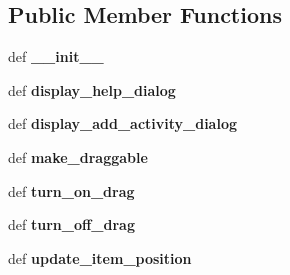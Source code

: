 \subsection*{Public Member Functions}
\begin{DoxyCompactItemize}
\item 
\hypertarget{classrunELFIN__Proto_1_1MyMainWindow_ae712f1531c068f6a48c7995d24eedb8b}{def {\bfseries \-\_\-\-\_\-init\-\_\-\-\_\-}}\label{classrunELFIN__Proto_1_1MyMainWindow_ae712f1531c068f6a48c7995d24eedb8b}

\item 
\hypertarget{classrunELFIN__Proto_1_1MyMainWindow_a9b4d571c6951792edf26a520921001bb}{def {\bfseries display\-\_\-help\-\_\-dialog}}\label{classrunELFIN__Proto_1_1MyMainWindow_a9b4d571c6951792edf26a520921001bb}

\item 
\hypertarget{classrunELFIN__Proto_1_1MyMainWindow_a47b0dcac1776188a9e28056635fd7588}{def {\bfseries display\-\_\-add\-\_\-activity\-\_\-dialog}}\label{classrunELFIN__Proto_1_1MyMainWindow_a47b0dcac1776188a9e28056635fd7588}

\item 
\hypertarget{classrunELFIN__Proto_1_1MyMainWindow_aba72f11babfa66d80c11a046c09332d1}{def {\bfseries make\-\_\-draggable}}\label{classrunELFIN__Proto_1_1MyMainWindow_aba72f11babfa66d80c11a046c09332d1}

\item 
\hypertarget{classrunELFIN__Proto_1_1MyMainWindow_a525386f6f6547235982a0f20a3f0848c}{def {\bfseries turn\-\_\-on\-\_\-drag}}\label{classrunELFIN__Proto_1_1MyMainWindow_a525386f6f6547235982a0f20a3f0848c}

\item 
\hypertarget{classrunELFIN__Proto_1_1MyMainWindow_acaf9b8a013f9ea24f7256b33394997a4}{def {\bfseries turn\-\_\-off\-\_\-drag}}\label{classrunELFIN__Proto_1_1MyMainWindow_acaf9b8a013f9ea24f7256b33394997a4}

\item 
\hypertarget{classrunELFIN__Proto_1_1MyMainWindow_afb328c99232062f43609a3ad9adbd8b5}{def {\bfseries update\-\_\-item\-\_\-position}}\label{classrunELFIN__Proto_1_1MyMainWindow_afb328c99232062f43609a3ad9adbd8b5}

\end{DoxyCompactItemize}
